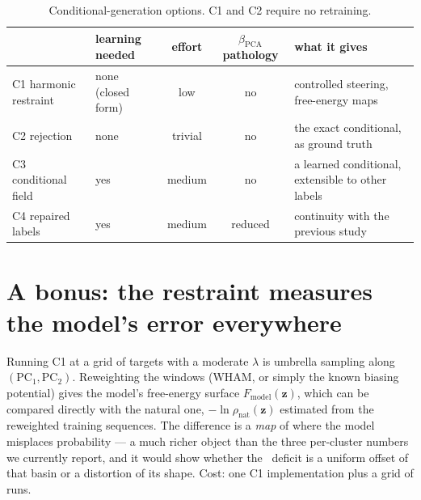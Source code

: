 \documentclass[10pt,a4paper]{article}
\newcommand{\cost}[1]{\textsf{\footnotesize #1}}
\newcommand{\PC}{\mathrm{PC}}
\newcommand{\PCA}{\mathrm{PCA}}
\begin{document}
\begin{table}[h]\centering\small
\begin{tabular}{llccl}
\toprule
 & learning needed & effort & $\beta_{\PCA}$ pathology & what it gives \\
\midrule
C1 harmonic restraint & none (closed form) & low    & no  & controlled steering, free-energy maps \\
C2 rejection          & none               & trivial& no  & the exact conditional, as ground truth \\
C3 conditional field  & yes                & medium & no  & a learned conditional, extensible to other labels \\
C4 repaired labels    & yes                & medium & reduced & continuity with the previous study \\
\bottomrule
\end{tabular}
\caption{Conditional-generation options. C1 and C2 require no retraining.}
\end{table}

\section{A bonus: the restraint measures the model's error everywhere}\label{sec:fe}
Running C1 at a grid of targets with a moderate $\lambda$ is umbrella sampling along
$(\PC_1,\PC_2)$. Reweighting the windows (WHAM, or simply the known biasing potential) gives the
model's free-energy surface $F_{\text{model}}(\bm z)$, which can be compared directly with the
natural one, $-\ln\rho_{\text{nat}}(\bm z)$ estimated from the reweighted training sequences. The
difference is a \emph{map} of where the model misplaces probability --- a much richer object than
the three per-cluster numbers we currently report, and it would show whether the \MissCl\ deficit
is a uniform offset of that basin or a distortion of its shape. \cost{Cost: one C1
implementation plus a grid of runs.}

\end{document}
